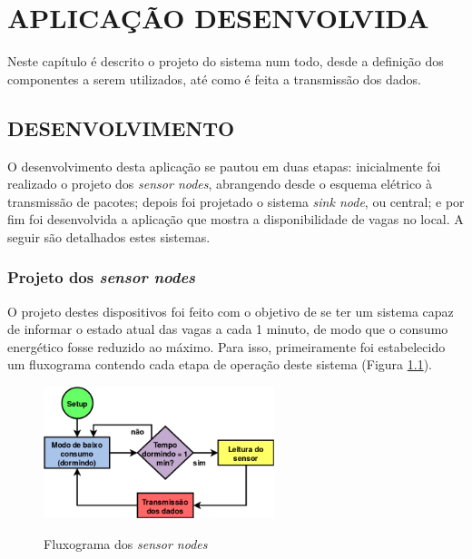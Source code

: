 \documentclass[oneside,openright,12pt]{ufsm_2015} %
\begin{document}
\chapter{APLICAÇÃO DESENVOLVIDA}
Neste capítulo é descrito o projeto do sistema num todo, desde a definição dos componentes a serem utilizados, até como é feita a transmissão dos dados.

    \section{DESENVOLVIMENTO}
    O desenvolvimento desta aplicação se pautou em duas etapas: inicialmente foi realizado o projeto dos \textit{sensor nodes}, abrangendo desde o esquema elétrico à transmissão de pacotes; depois foi projetado o sistema \textit{sink node}, ou central; e por fim foi desenvolvida a aplicação que mostra a disponibilidade de vagas no local. A seguir são detalhados estes sistemas.
    
    \subsection{Projeto dos \textit{sensor nodes}}
    O projeto destes dispositivos foi feito com o objetivo de se ter um sistema capaz de informar o estado atual das vagas a cada 1 minuto, de modo que o consumo energético fosse reduzido ao máximo. Para isso, primeiramente foi estabelecido um fluxograma contendo cada etapa de operação deste sistema (Figura \ref{fig:flux-sensor-node}).
    
    \begin{figure}[ht]
     	    \caption{\label{exepretex} Fluxograma dos \textit{sensor nodes}}
            \centering
            \includegraphics[width=0.6\textwidth]{figuras/funcionamento-sensor-node.png}
            \vspace{\baselineskip} %
                \label{fig:flux-sensor-node}
    \end{figure}
    
\end{document}
